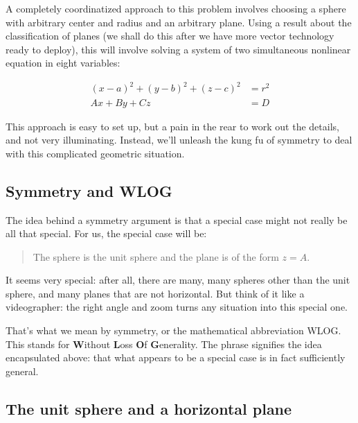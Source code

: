 \documentclass[12pt]{exam}
\begin{document}
A completely coordinatized approach to this problem involves choosing a
sphere with arbitrary center and radius and an arbitrary plane. Using a
result about the classification of planes (we shall do this after we
have more vector technology ready to deploy), this will involve solving
a system of two simultaneous nonlinear equation in eight variables:

\begin{align*}
    (x - a)^2 + (y - b)^2 + (z - c)^2 &= r^2 \\
    Ax + By + Cz &= D 
\end{align*}

This approach is easy to set up, but a pain in the rear to work out the
details, and not very illuminating. Instead, we'll unleash the kung fu
of symmetry to deal with this complicated geometric situation.

\subsection{Symmetry and WLOG}

The idea behind a symmetry argument is that a special case might not
really be all that special. For us, the special case will be:

\begin{quote}
The sphere is the unit sphere and the plane is of the form $z = A$.
\end{quote}

It seems very special: after all, there are many, many spheres other
than the unit sphere, and many planes that are not horizontal. But think
of it like a videographer: the right angle and zoom turns any situation
into this special one.

That's what we mean by symmetry, or the mathematical abbreviation WLOG.
This stands for \textbf{W}ithout \textbf{L}oss \textbf{O}f
\textbf{G}enerality. The phrase signifies the idea encapsulated above:
that what appears to be a special case is in fact sufficiently general.

\subsection{The unit sphere and a horizontal plane}
\end{document}
